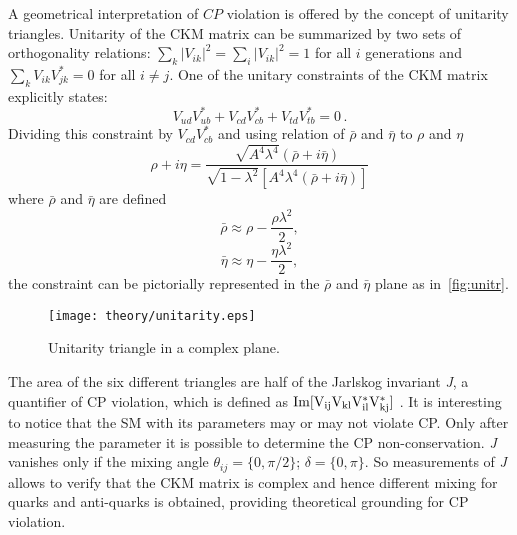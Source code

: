 A geometrical interpretation of $CP$ violation is offered by the concept of unitarity triangles. Unitarity of the \gls{CKM} matrix can be summarized by two sets of orthogonality relations:
$\sum_{k} |V_{ik}|^2 = \sum_{i} |V_{ik}|^2 = 1$ for all $i$ generations and $\sum_k V_{ik}V^*_{jk} = 0$ for all $i\neq j$. One of the unitary constraints of the \gls{CKM} matrix explicitly states:
\begin{equation}
  V_{ud}V^*_{ub} + V_{cd}V^*_{cb} + V_{td}V^*_{tb} = 0 \, .
\end{equation}
Dividing this constraint by $V_{cd}V^*_{cb}$ and using relation of $\bar{\rho}$ and $\bar{\eta}$ to ${\rho}$ and ${\eta}$ 
\begin{equation}
   {\rho} + i {\eta} = \frac{\sqrt{A^{4}\lambda^{4}}(\bar{\rho} + i \bar{\eta})}{\sqrt{1-\lambda^2}[A^{4}\lambda^{4}(\bar{\rho} + i \bar{\eta})]}
\end{equation}
 where $\bar{\rho}$ and $\bar{\eta}$ are defined
\begin{equation}
\bar{\rho} \approx \rho - \frac{\rho\lambda^{2}}{2},
\end{equation}
\begin{equation}
\bar{\eta} \approx \eta - \frac{\eta\lambda^{2}}{2},
\end{equation}
the constraint can be pictorially represented in the $\bar{\rho}$ and $\bar{\eta}$ plane as in~\autoref{fig:unitr}.
\begin{figure}[h]
\centering
\texttt{[image: theory/unitarity.eps]}
\caption{Unitarity triangle in a complex plane.}
\label{fig:unitr}
\end{figure}
The area of the six different triangles are half of the Jarlskog invariant \textit{J}, a quantifier of CP violation, which is defined as $\rm{Im}[V_{ij}V_{kl}V^*_{il}V^*_{kj}]$ \cite{Jarlskog:1985ht}. It is interesting to notice that the \gls{SM} with its parameters may or may not violate CP. Only after measuring the parameter it is possible to determine the CP non-conservation. \textit{J} vanishes only if the mixing angle $\theta_{ij} = \{0 , \pi/2\}$; $\delta = \{0 , \pi\}$. So measurements of \textit{J} allows to verify that the \gls{CKM} matrix is complex and hence different mixing for quarks and anti-quarks is obtained, providing theoretical grounding for CP violation.%

